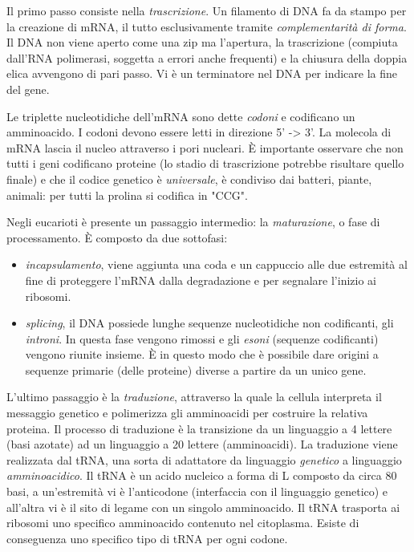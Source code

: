 \par Il primo passo consiste nella \textit{trascrizione}. Un filamento di DNA fa da stampo per la creazione di mRNA, il tutto esclusivamente tramite \textit{complementarità di forma}. Il DNA non viene aperto come una zip ma l'apertura, la trascrizione (compiuta dall'RNA polimerasi, soggetta a errori anche frequenti) e la chiusura della doppia elica avvengono di pari passo. Vi è un terminatore nel DNA per indicare la fine del gene. 

\par Le triplette nucleotidiche dell'mRNA sono dette \textit{codoni} e codificano un amminoacido. I codoni devono essere letti in direzione 5' -> 3'. La molecola di mRNA lascia il nucleo attraverso i pori nucleari. È importante osservare che non tutti i geni codificano proteine (lo stadio di trascrizione potrebbe risultare quello finale) e che il codice genetico è \textit{universale}, è condiviso dai batteri, piante, animali: per tutti la prolina si codifica in "CCG".

\par Negli eucarioti è presente un passaggio intermedio: la \textit{maturazione}, o fase di processamento. È composto da due sottofasi:
\begin{itemize}
	\item \textit{incapsulamento}, viene aggiunta una coda e un cappuccio alle due estremità al fine di proteggere l'mRNA dalla degradazione e per segnalare l'inizio ai ribosomi.
	\item \textit{splicing}, il DNA possiede lunghe sequenze nucleotidiche non codificanti, gli \textit{introni}. In questa fase vengono rimossi e gli \textit{esoni} (sequenze codificanti) vengono riunite insieme. È in questo modo che è possibile dare origini a sequenze primarie (delle proteine) diverse a partire da un unico gene.
\end{itemize}

\par L'ultimo passaggio è la \textit{traduzione}, attraverso la quale la cellula interpreta il messaggio genetico e polimerizza gli amminoacidi per costruire la relativa proteina. Il processo di traduzione è la transizione da un linguaggio a 4 lettere (basi azotate) ad un linguaggio a 20 lettere (amminoacidi). La traduzione viene realizzata dal tRNA, una sorta di adattatore da linguaggio \textit{genetico }a linguaggio \textit{amminoacidico}. Il tRNA è un acido nucleico a forma di L composto da circa 80 basi, a un'estremità vi è l'anticodone (interfaccia con il linguaggio genetico) e all'altra vi è il sito di legame con un singolo amminoacido. Il tRNA trasporta ai ribosomi uno specifico amminoacido contenuto nel citoplasma. Esiste di conseguenza uno specifico tipo di tRNA per ogni codone.


